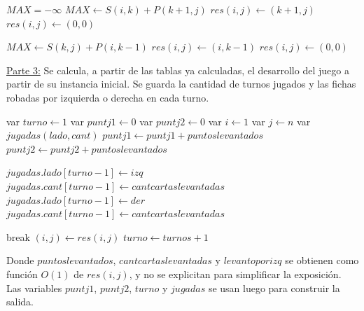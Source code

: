 \begin{algorithmic}[1]
		\State $MAX = -\infty$
				\State $MAX \leftarrow S(i,k) + P(k+1,j)$
					\State $res(i,j) \leftarrow (k+1,j)$
				\Else
					\State $res(i,j) \leftarrow (0,0)$
				\EndIf
			\EndIf
		\EndFor


				\State $MAX \leftarrow S(k,j) + P(i,k-1)$
					\State $res(i,j) \leftarrow (i,k-1)$
				\Else
					\State $res(i,j) \leftarrow (0,0)$
				\EndIf
			\EndIf
		\EndFor
	\EndFor
\EndFor
\end{algorithmic}

\underline{Parte 3:} Se calcula, a partir de las tablas ya calculadas, el desarrollo del juego a partir de su instancia inicial. Se guarda la cantidad de turnos jugados y las fichas robadas por izquierda o derecha en cada turno.

\begin{algorithmic}
\State var $turno \leftarrow 1$
\State var $puntj1 \leftarrow 0$
\State var $puntj2 \leftarrow 0$
\State var $i \leftarrow 1$
\State var $j \leftarrow n$
\State var $jugadas(lado,cant)$
\Loop
		\State $puntj1 \leftarrow puntj1 + puntoslevantados$
	\Else
		\State $puntj2 \leftarrow puntj2 + puntoslevantados$ 
	\EndIf

		\State $jugadas.lado[turno-1] \leftarrow izq$
		\State $jugadas.cant[turno-1] \leftarrow cantcartaslevantadas$
	\Else
		\State $jugadas.lado[turno-1] \leftarrow der$
		\State $jugadas.cant[turno-1] \leftarrow cantcartaslevantadas$
	\EndIf
	
		\State break
	\EndIf
	\State $(i,j) \leftarrow res(i,j)$
	\State $turno \leftarrow turnos+1$
\EndLoop
\end{algorithmic}
Donde $puntoslevantados$, $cantcartaslevantadas$ y $levantoporizq$ se obtienen como funci\'on $O(1)$ de $res(i,j)$, y no se explicitan para simplificar la exposici\'on. Las variables $puntj1$, $puntj2$, $turno$ y $jugadas$ se usan luego para construir la salida.

